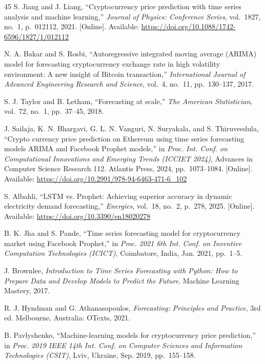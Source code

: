 \documentclass[conference]{IEEEtran}
\begin{document}
\begin{thebibliography}{45}
S. Jiang and J. Liang, ``Cryptocurrency price prediction with time series analysis and machine learning,'' \textit{Journal of Physics: Conference Series}, vol.~1827, no.~1, p.~012112, 2021. [Online]. Available: \url{https://doi.org/10.1088/1742-6596/1827/1/012112}

N. A. Bakar and S. Rosbi, ``Autoregressive integrated moving average (ARIMA) model for forecasting cryptocurrency exchange rate in high volatility environment: A new insight of Bitcoin transaction,'' \textit{International Journal of Advanced Engineering Research and Science}, vol.~4, no.~11, pp.~130--137, 2017.

S. J. Taylor and B. Letham, ``Forecasting at scale,'' \textit{The American Statistician}, vol.~72, no.~1, pp.~37--45, 2018.

J. Sailaja, K. N. Bhargavi, G. L. N. Vanguri, N. Suryakala, and S. Thiruveedula, ``Crypto currency price prediction on Ethereum using time series forecasting models ARIMA and Facebook Prophet models,'' in \textit{Proc. Int. Conf. on Computational Innovations and Emerging Trends (ICCIET 2024)}, Advances in Computer Science Research 112. Atlantis Press, 2024, pp.~1073--1084. [Online]. Available: \url{https://doi.org/10.2991/978-94-6463-471-6_102}

S. Albahli, ``LSTM vs. Prophet: Achieving superior accuracy in dynamic electricity demand forecasting,'' \textit{Energies}, vol.~18, no.~2, p.~278, 2025. [Online]. Available: \url{https://doi.org/10.3390/en18020278}

B. K. Jha and S. Pande, ``Time series forecasting model for cryptocurrency market using Facebook Prophet,'' in \textit{Proc. 2021 6th Int. Conf. on Inventive Computation Technologies (ICICT)}, Coimbatore, India, Jan. 2021, pp.~1--5.

J. Brownlee, \textit{Introduction to Time Series Forecasting with Python: How to Prepare Data and Develop Models to Predict the Future}. Machine Learning Mastery, 2017.

R. J. Hyndman and G. Athanasopoulos, \textit{Forecasting: Principles and Practice}, 3rd ed. Melbourne, Australia: OTexts, 2021.

B. Pavlyshenko, ``Machine-learning models for cryptocurrency price prediction,'' in \textit{Proc. 2019 IEEE 14th Int. Conf. on Computer Sciences and Information Technologies (CSIT)}, Lviv, Ukraine, Sep. 2019, pp.~155--158.


\end{thebibliography}
\end{document}
